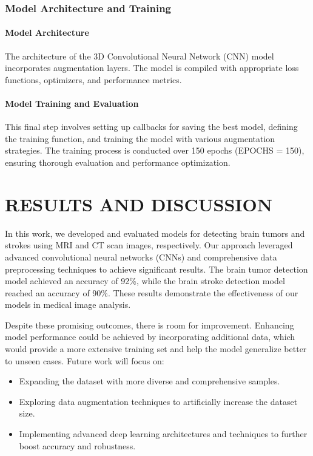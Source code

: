 \documentclass[conference]{IEEEtran}
\begin{document}
\subsubsection{Model Architecture and Training}

\paragraph{Model Architecture}
The architecture of the 3D Convolutional Neural Network (CNN) model incorporates augmentation layers. The model is compiled with appropriate loss functions, optimizers, and performance metrics.

\paragraph{Model Training and Evaluation}
This final step involves setting up callbacks for saving the best model, defining the training function, and training the model with various augmentation strategies. The training process is conducted over 150 epochs (EPOCHS = 150), ensuring thorough evaluation and performance optimization.

 
\section{RESULTS AND DISCUSSION}

In this work, we developed and evaluated models for detecting brain tumors and strokes using MRI and CT scan images, respectively. Our approach leveraged advanced convolutional neural networks (CNNs) and comprehensive data preprocessing techniques to achieve significant results. The brain tumor detection model achieved an accuracy of 92\%, while the brain stroke detection model reached an accuracy of 90\%. These results demonstrate the effectiveness of our models in medical image analysis.

Despite these promising outcomes, there is room for improvement. Enhancing model performance could be achieved by incorporating additional data, which would provide a more extensive training set and help the model generalize better to unseen cases. Future work will focus on:
\begin{itemize}
    \item Expanding the dataset with more diverse and comprehensive samples.
    \item Exploring data augmentation techniques to artificially increase the dataset size.
    \item Implementing advanced deep learning architectures and techniques to further boost accuracy and robustness.
\end{itemize}
\end{document}
